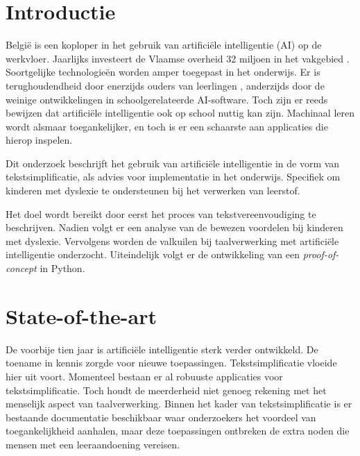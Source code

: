 
\section{Introductie}%
\label{sec:introductie}

België is een koploper in het gebruik van artificiële intelligentie (AI) op de werkvloer. Jaarlijks investeert de Vlaamse overheid 32 miljoen in het vakgebied \autocite{Crevits2022}. Soortgelijke technologieën worden amper toegepast in het onderwijs. Er is terughoudendheid door enerzijds ouders van leerlingen \autocite{Martens2021}, anderzijds door de weinige ontwikkelingen in schoolgerelateerde AI-software. Toch zijn er reeds bewijzen dat artificiële intelligentie ook op school nuttig kan zijn. Machinaal leren wordt alsmaar toegankelijker, en toch is er een schaarste aan applicaties die hierop inspelen.

Dit onderzoek beschrijft het gebruik van artificiële intelligentie in de vorm van tekstsimplificatie, als advies voor implementatie in het onderwijs. Specifiek om kinderen met dyslexie te ondersteunen bij het verwerken van leerstof.

Het doel wordt bereikt door eerst het proces van tekstvereenvoudiging te beschrijven. Nadien volgt er een analyse van de bewezen voordelen bij kinderen met dyslexie. Vervolgens worden de valkuilen bij taalverwerking met artificiële intelligentie onderzocht. Uiteindelijk volgt er de ontwikkeling van een \textit{proof-of-concept} in Python. 


\section{State-of-the-art}%
\label{sec:state-of-the-art}


De voorbije tien jaar is artificiële intelligentie sterk verder ontwikkeld. De toename in kennis zorgde voor nieuwe toepassingen. Tekstsimplificatie vloeide hier uit voort. Momenteel bestaan er al robuuste applicaties voor tekstsimplificatie. Toch houdt de meerderheid niet genoeg rekening met het menselijk aspect van taalverwerking. Binnen het kader van tekstsimplificatie is er bestaande documentatie beschikbaar waar onderzoekers het voordeel van toegankelijkheid aanhalen, maar deze toepassingen ontbreken de extra noden die mensen met een leeraandoening vereisen.

